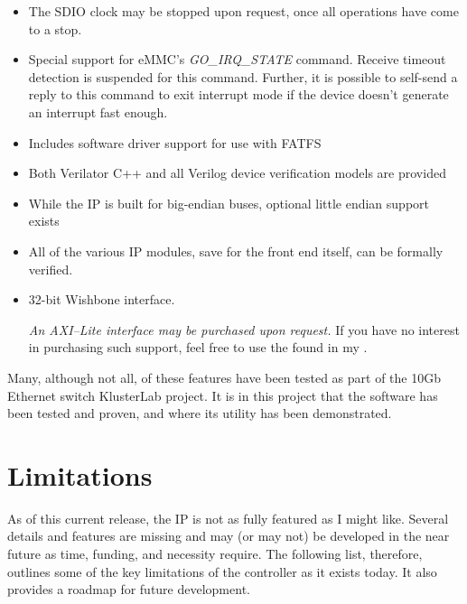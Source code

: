 \documentclass{gqtekspec}
\begin{document}
\begin{itemize}
\item The SDIO clock may be stopped upon request, once all operations have
	come to a stop.

\item Special support for eMMC's {\em GO\_IRQ\_STATE} command.  Receive timeout
	detection is suspended for this command.  Further, it is possible to
	self-send a reply to this command to exit interrupt mode if the device
	doesn't generate an interrupt fast enough.

\item Includes software driver support for use with FATFS

\item Both Verilator C++ and all Verilog device verification models are provided

\item While the IP is built for big-endian buses, optional little endian
	support exists

\item All of the various IP modules, save for the front end itself, can be
	formally verified.

\item 32-bit Wishbone interface.

	{\em An AXI--Lite interface may be purchased upon request.} If you have
	no interest in purchasing such support, feel free to use the
	 found in my
	.
\end{itemize}

Many, although not all, of these features have been tested as part of the 10Gb
Ethernet switch KlusterLab project.  It is in this project that the software
has been tested and proven, and where its utility has been demonstrated.

\section{Limitations}

As of this current release, the IP is not as fully featured as I might
like.  Several details and features are missing and may (or may not)
be developed in the near future as time, funding, and necessity require.
The following list, therefore, outlines some of the key limitations of the
controller as it exists today.  It also provides a roadmap for future
development.
\end{document}

